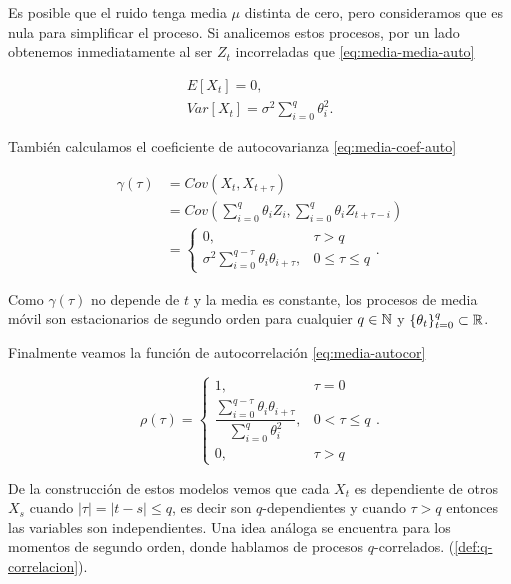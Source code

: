 Es posible que el ruido tenga media $\mu$ distinta de cero, pero consideramos que es nula para simplificar el proceso. Si analicemos estos procesos, por un lado obtenemos inmediatamente al ser $Z_t$ incorreladas que \eqref{eq:media-media-auto}

\begin{gather}
  E[X_t] = 0, \\
  Var[X_t] = \sigma^2 \sum \limits^q_{i = 0} \theta_i^2.
  \label{eq:media-media-auto}
\end{gather}

También calculamos el coeficiente de autocovarianza \eqref{eq:media-coef-auto}

\begin{equation}
  \begin{aligned}
    \gamma(\tau) & = Cov(X_t, X_{t + \tau}) \\
    & = Cov\left(\sum \limits^q_{i = 0} \theta_i Z_i, \sum \limits^q_{i = 0} \theta_i Z_{t + \tau - i}\right) \\
    & = \begin{cases}
      0, & \tau > q \\
      \sigma^2 \sum \limits^{q - \tau}_{i = 0} \theta_i \theta_{i + \tau}, & 0 \leq \tau \leq q
    \end{cases}.
  \end{aligned}
\label{eq:media-coef-auto}
\end{equation}

Como $\gamma(\tau)$ no depende de $t$ y la media es constante, los procesos de media móvil son estacionarios de segundo orden para cualquier $q \in \mathbb{N}$ y $\{\theta_t\}_{t = 0}^q \subset \mathbb{R}$.

Finalmente veamos la función de autocorrelación \eqref{eq:media-autocor}

\begin{equation}
  \rho(\tau) = \begin{cases}
    1, & \tau = 0 \\
    \dfrac{\sum \limits^{q - \tau}_{i = 0} \theta_i \theta_{i + \tau}}{\sum \limits^q_{i = 0} \theta_i^2}, & 0 < \tau \leq q \\
    0, & \tau > q
  \end{cases}.
  \label{eq:media-autocor}
\end{equation}

De la construcción de estos modelos vemos que cada $X_t$ es dependiente de otros $X_s$ cuando $|\tau| = |t-s| \leq q$, es decir son $q$-dependientes y cuando $\tau > q$ entonces las variables son independientes. Una idea análoga se encuentra para los momentos de segundo orden, donde hablamos de procesos $q$-correlados. (\autoref{def:q-correlacion}).

